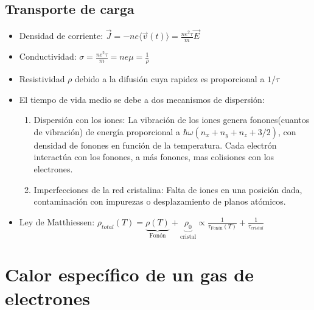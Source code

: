 \documentclass[oneside]{book}
\numberwithin{equation}{section}
\numberwithin{figure}{section}
\numberwithin{table}{section}
\begin{document}
			\subsection{Transporte de carga}
			
				\begin{itemize}
					\item Densidad de corriente: $\displaystyle \vec{J}=-ne \langle \vec{v}(t) \rangle=\frac{n e^2 \tau}{m}\vec{E}$
					\item Conductividad: $\displaystyle \sigma=\frac{n e^2 \tau}{m}=ne\mu=\frac{1}{\rho}$
					\item Resistividad $\rho$ debido a la difusión cuya rapidez es proporcional a $1/\tau$
					\item El tiempo de vida medio se debe a dos mecanismos de dispersión:
						\begin{enumerate}
							\item Dispersión con los iones: La vibración de los iones genera fonones(cuantos de vibración) de energía proporcional a $\hbar \omega(n_x+n_y+n_z+3/2)$, con densidad de fonones en función de la temperatura. Cada electrón interactúa con los fonones, a más fonones, mas colisiones con los electrones.
							\item Imperfecciones de la red cristalina: Falta de iones en una posición dada, contaminación con impurezas o desplazamiento de planos atómicos.
						\end{enumerate}
					\item Ley de Matthiessen: $\displaystyle \rho_{total}(T)=\underbrace{\rho(T)}_{\text{Fonón}}+\underbrace{\rho_0}_{\text{cristal}} \propto \frac{1}{\tau_{\text{Fonón}}(T)}+\frac{1}{\tau_{cristal}}$					
				\end{itemize}
			
		\section{Calor específico de un gas de electrones}
		
\end{document}
